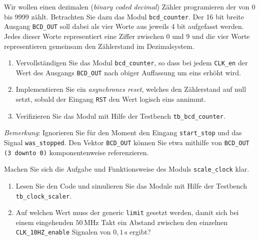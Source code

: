 \documentclass[12pt]{article}
\begin{document}


Wir wollen einen dezimalen (\textit{binary coded decimal}) Zähler programieren der von 0 bis 9999 zählt.
Betrachten Sie dazu das Modul \texttt{bcd\_counter}. Der 16 bit breite Ausgang \texttt{BCD\_OUT} soll dabei als vier Worte aus jeweils 4 bit aufgefasst werden. Jedes dieser Worte representiert eine Ziffer zwischen 0 und 9 und die vier Worte representieren gemeinsam den Zählerstand im Dezimalsystem.


\begin{enumerate}[label=\alph*.)]


\item Vervollständigen Sie das Modul \texttt{bcd\_counter}, so dass bei jedem \texttt{CLK\_en} der Wert des Ausgangs \texttt{BCD\_OUT} nach obiger Auffassung um eins erhöht wird.


\item Implementieren Sie ein \textit{asynchrones reset}, welches den Zählerstand auf null setzt, sobald der
Eingang \texttt{RST} den Wert logisch eins annimmt.


\item Verifizieren Sie das Modul mit Hilfe der Testbench \texttt{tb\_bcd\_counter}. 


\end{enumerate}


\textit{Bemerkung}: Ignorieren Sie für den Moment den Eingang \texttt{start\_stop} und das Signal \texttt{was\_stopped}. Den Vektor \texttt{BCD\_OUT} können Sie etwa mithilfe von \glqq \texttt{BCD\_OUT (3 downto 0)}\grqq \,\,komponentenweise referenzieren.







Machen Sie sich die Aufgabe und Funktionsweise des Moduls \texttt{scale\_clock} klar.


\begin{enumerate}[label=\alph*.)]


\item Lesen Sie den Code und simulieren Sie das Module mit Hilfe der Testbench \texttt{tb\_clock\_scaler}.


\item Auf welchen Wert muss der generic \texttt{limit} gesetzt werden, damit sich bei einem eingehenden $50\,\mathrm{MHz}$ Takt ein Abstand zwischen den einzelnen \texttt{CLK\_10HZ\_enable} Signalen von $0{,}1\,\mathrm{s}$ ergibt?


\end{enumerate}
\end{document}

